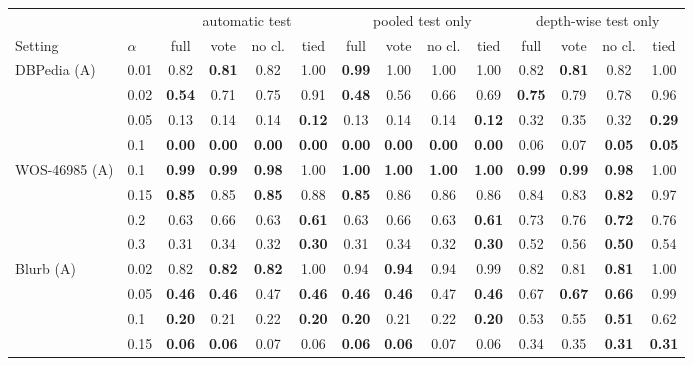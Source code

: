 \begin{tabular}{llcccccccccccc}
\toprule
 & & \multicolumn{4}{c}{automatic test} & \multicolumn{4}{c}{pooled test only} & \multicolumn{4}{c}{depth-wise test only} \\
\cmidrule(lr){3-6} \cmidrule(lr){7-10} \cmidrule(lr){11-14}
Setting & $\alpha$ & full & vote & no cl. & tied & full & vote & no cl. & tied & full & vote & no cl. & tied \\
\midrule
DBPedia (A) & 0.01 & 0.82 & \textbf{0.81} & 0.82 & 1.00 & \textbf{0.99} & 1.00 & 1.00 & 1.00 & 0.82 & \textbf{0.81} & 0.82 & 1.00 \\
 & 0.02 & \textbf{0.54} & 0.71 & 0.75 & 0.91 & \textbf{0.48} & 0.56 & 0.66 & 0.69 & \textbf{0.75} & 0.79 & 0.78 & 0.96 \\
 & 0.05 & 0.13 & 0.14 & 0.14 & \textbf{0.12} & 0.13 & 0.14 & 0.14 & \textbf{0.12} & 0.32 & 0.35 & 0.32 & \textbf{0.29} \\
 & 0.1 & \textbf{0.00} & \textbf{0.00} & \textbf{0.00} & \textbf{0.00} & \textbf{0.00} & \textbf{0.00} & \textbf{0.00} & \textbf{0.00} & 0.06 & 0.07 & \textbf{0.05} & \textbf{0.05} \\
\midrule
WOS-46985 (A) & 0.1 & \textbf{0.99} & \textbf{0.99} & \textbf{0.98} & 1.00 & \textbf{1.00} & \textbf{1.00} & \textbf{1.00} & \textbf{1.00} & \textbf{0.99} & \textbf{0.99} & \textbf{0.98} & 1.00 \\
 & 0.15 & \textbf{0.85} & 0.85 & \textbf{0.85} & 0.88 & \textbf{0.85} & 0.86 & 0.86 & 0.86 & 0.84 & 0.83 & \textbf{0.82} & 0.97 \\
 & 0.2 & 0.63 & 0.66 & 0.63 & \textbf{0.61} & 0.63 & 0.66 & 0.63 & \textbf{0.61} & 0.73 & 0.76 & \textbf{0.72} & 0.76 \\
 & 0.3 & 0.31 & 0.34 & 0.32 & \textbf{0.30} & 0.31 & 0.34 & 0.32 & \textbf{0.30} & 0.52 & 0.56 & \textbf{0.50} & 0.54 \\
\midrule
Blurb (A) & 0.02 & 0.82 & \textbf{0.82} & \textbf{0.82} & 1.00 & 0.94 & \textbf{0.94} & 0.94 & 0.99 & 0.82 & 0.81 & \textbf{0.81} & 1.00 \\
 & 0.05 & \textbf{0.46} & \textbf{0.46} & 0.47 & \textbf{0.46} & \textbf{0.46} & \textbf{0.46} & 0.47 & \textbf{0.46} & 0.67 & \textbf{0.67} & \textbf{0.66} & 0.99 \\
 & 0.1 & \textbf{0.20} & 0.21 & 0.22 & \textbf{0.20} & \textbf{0.20} & 0.21 & 0.22 & \textbf{0.20} & 0.53 & 0.55 & \textbf{0.51} & 0.62 \\
 & 0.15 & \textbf{0.06} & \textbf{0.06} & 0.07 & 0.06 & \textbf{0.06} & \textbf{0.06} & 0.07 & 0.06 & 0.34 & 0.35 & \textbf{0.31} & \textbf{0.31} \\

\end{tabular}
